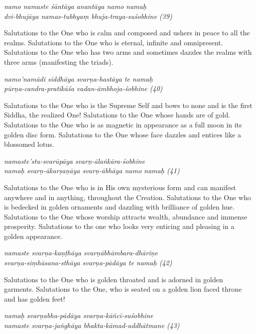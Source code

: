 \documentclass[12pt,oneside,a4paper]{article}
\newenvironment{shloka}[1]
  {\bigskip\center#1\varwidth{\linewidth}}
  {\endvarwidth\endcenter\bigskip}
\begin{document}
\begin{shloka}\itshape
  namo namaste śāntāya anantāya namo namaḥ\\
  dvi-bhujāya namas-tubhyaṃ bhuja-traya-suśobhine (39)
\end{shloka}

Salutations to the One who is calm and composed and ushers in peace to all
the realms. Salutations to the One who is eternal, infinite and omnipresent.
Salutations to the One who has two arms and sometimes dazzles the realms with
three arms (manifesting the triads).

\begin{shloka}\itshape
  namo'namādi siddhāya svarṇa-hastāya te namaḥ\\
  pūrṇa-candra-pratīkāśa vadan-āmbhoja-śobhine (40)
\end{shloka}

Salutations to the One who is the Supreme Self and bows to none and is the first
Siddha, the realized One! Salutations to the One whose hands are of gold.
Salutations to the One who is as magnetic in appearance as a full moon in its
golden disc form. Salutations to the One whose face dazzles and entices like
a blossomed lotus.

\begin{shloka}\itshape
  namaste'stu-svarūpāya svarṇ-ālaṅkāra-śobhine\\
  namaḥ svarṇ-ākarṣaṇāya svarṇ-ābhāya namo namaḥ (41)
\end{shloka}

Salutations to the One who is in His own mysterious form and can manifest
anywhere and in anything, throughout the Creation. Salutations to the One who is
bedecked in golden ornaments and dazzling with brilliance of golden hue.
Salutations to the One whose worship attracts wealth, abundance and immense
prosperity. Salutations to the one who looks very enticing and pleasing in
a golden appearance.

\begin{shloka}\itshape
  namaste svarṇa-kaṇṭhāya svarṇābhāmbara-dhāriṇe\\
  svarṇa-siṃhāsana-sthāya svarṇa-pādāya te namaḥ (42)
\end{shloka}

Salutations to the One who is golden throated and is adorned in golden garments.
Salutations to the One, who is seated on a golden lion faced throne and has
golden feet!

\begin{shloka}\itshape
  namaḥ svarṇabha-pādāya svarṇa-kāñcī-suśobhine\\
  namaste svarṇa-jaṅghāya bhakta-kāmad-uddhātmane (43)
\end{shloka}
\end{document}
